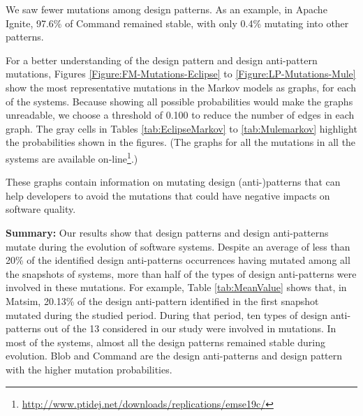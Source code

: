 We saw fewer mutations among design patterns. As an example, in Apache Ignite, 97.6\% of Command remained stable, with only 0.4\% mutating into other patterns.



For a better understanding of the design pattern and design anti-pattern mutations, Figures \ref{Figure:FM-Mutations-Eclipse} to \ref{Figure:LP-Mutations-Mule} show the most representative mutations in the Markov models as graphs, for each of the systems. Because showing all possible probabilities would make the graphs unreadable, we choose a threshold of 0.100 to reduce the number of edges in each graph. The gray cells in Tables \ref{tab:EclipseMarkov} to  \ref{tab:Mulemarkov} highlight the probabilities shown in the figures. (The graphs for all the mutations in all the systems are available on-line\footnote{\url{http://www.ptidej.net/downloads/replications/emse19c/}}.)

These graphs contain information on mutating design (anti-)patterns that can help developers to avoid the mutations that could have negative impacts on software quality. 

\begin{tcolorbox}
\vspace{-0.1cm}
\textbf{Summary:} Our results show that design patterns and design anti-patterns mutate during the evolution of software systems. Despite an average of less than 20\% of the identified design anti-patterns occurrences having mutated among all the snapshots of systems, more than half of the types of design anti-patterns were involved in these mutations. For example, Table \ref{tab:MeanValue} shows that, in Matsim, 20.13\% of the design anti-pattern identified  in the first snapshot mutated during the studied period. During that period, ten types of design anti-patterns out of the 13 considered in our study were involved in mutations. In most of the systems, almost all the design patterns remained stable during evolution. Blob and Command are the design anti-patterns and design pattern with the higher mutation probabilities.
\vspace{-0.1cm}
\end{tcolorbox}



